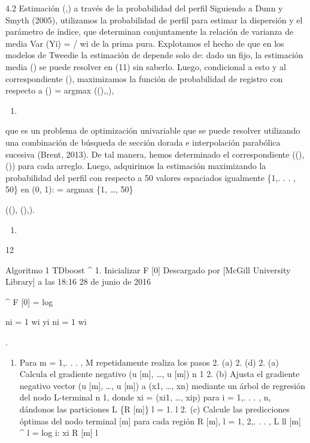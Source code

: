 \documentclass[]{article}
\providecommand{\tightlist}{%
  \setlength{\itemsep}{0pt}\setlength{\parskip}{0pt}}
\begin{document}
4.2 Estimación (,) a través de la probabilidad del perfil Siguiendo a
Dunn y Smyth (2005), utilizamos la probabilidad de perfil para estimar
la dispersión y el parámetro de índice, que determinan conjuntamente la
relación de varianza de media Var (Yi) = / wi de la prima pura.
Explotamos el hecho de que en los modelos de Tweedie la estimación de
depende solo de: dado un fijo, la estimación media () se puede resolver
en (11) sin saberlo. Luego, condicional a esto y al correspondiente (),
maximizamos la función de probabilidad de registro con respecto a () =
argmax ((),,),

\begin{enumerate}
\def\labelenumi{(\arabic{enumi})}
\setcounter{enumi}{19}
\item
\end{enumerate}

que es un problema de optimización univariable que se puede resolver
utilizando una combinación de búsqueda de sección dorada e interpolación
parabólica sucesiva (Brent, 2013). De tal manera, hemos determinado el
correspondiente ((), ()) para cada arreglo. Luego, adquirimos la
estimación maximizando la probabilidad del perfil con respecto a 50
valores espaciados igualmente \{1,. . . , 50\} en (0, 1): = argmax \{1,
\ldots{}, 50\}

((), (),).

\begin{enumerate}
\def\labelenumi{(\arabic{enumi})}
\setcounter{enumi}{20}
\item
\end{enumerate}

12



Algoritmo 1 TDboost \^{} 1. Inicializar F {[}0{]} Descargado por
{[}McGill University Library{]} a las 18:16 28 de junio de 2016

\^{} F {[}0{]} = log

ni = 1 wi yi ni = 1 wi

.

\begin{enumerate}
\def\labelenumi{\arabic{enumi}.}
\setcounter{enumi}{1}
\tightlist
\item
  Para m = 1,. . . , M repetidamente realiza los pasos 2. (a) 2. (d) 2.
  (a) Calcula el gradiente negativo (u {[}m{]}, \ldots{}, u {[}m{]}) n 1
  2. (b) Ajusta el gradiente negativo vector (u {[}m{]}, \ldots{}, u
  {[}m{]}) a (x1, \ldots{}, xn) mediante un árbol de regresión del nodo
  L-terminal n 1, donde xi = (xi1, \ldots{}, xip) para i = 1,. . . , n,
  dándonos las particiones L \{R {[}m{]}\} l = 1. l 2. (c) Calcule las
  predicciones óptimas del nodo terminal {[}m{]} para cada región R
  {[}m{]}, l = 1, 2,. . . , L ll {[}m{]} \^{} l = log i: xi R {[}m{]} l
\end{enumerate}
\end{document}
